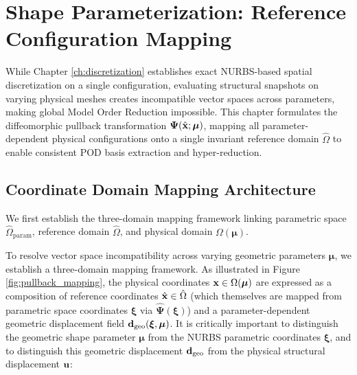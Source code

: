 \chapter{Shape Parameterization: Reference Configuration Mapping}
\label{ch:pullback}



While Chapter \ref{ch:discretization} establishes exact NURBS-based spatial discretization on a single configuration, evaluating structural snapshots on varying physical meshes creates incompatible vector spaces across parameters, making global Model Order Reduction impossible. This chapter formulates the diffeomorphic pullback transformation $\boldsymbol{\Psi}(\hat{\mathbf{x}}; \boldsymbol{\mu})$, mapping all parameter-dependent physical configurations onto a single invariant reference domain $\hat{\Omega}$ to enable consistent POD basis extraction and hyper-reduction.

\section{Coordinate Domain Mapping Architecture}

We first establish the three-domain mapping framework linking parametric space $\hat{\Omega}_{\text{param}}$, reference domain $\hat{\Omega}$, and physical domain $\Omega(\boldsymbol{\mu})$.

To resolve vector space incompatibility across varying geometric parameters $\boldsymbol{\mu}$, we establish a three-domain mapping framework. As illustrated in Figure \ref{fig:pullback_mapping}, the physical coordinates $\mathbf{x} \in \Omega(\boldsymbol{\mu})$ are expressed as a composition of reference coordinates $\hat{\mathbf{x}} \in \hat{\Omega}$ (which themselves are mapped from parametric space coordinates $\boldsymbol{\xi}$ via $\hat{\boldsymbol{\Psi}}(\boldsymbol{\xi})$) and a parameter-dependent geometric displacement field $\mathbf{d}_{\text{geo}}(\boldsymbol{\xi}, \boldsymbol{\mu})$. It is critically important to distinguish the geometric shape parameter $\boldsymbol{\mu}$ from the NURBS parametric coordinates $\boldsymbol{\xi}$, and to distinguish this geometric displacement $\mathbf{d}_{\text{geo}}$ from the physical structural displacement $\mathbf{u}$:

